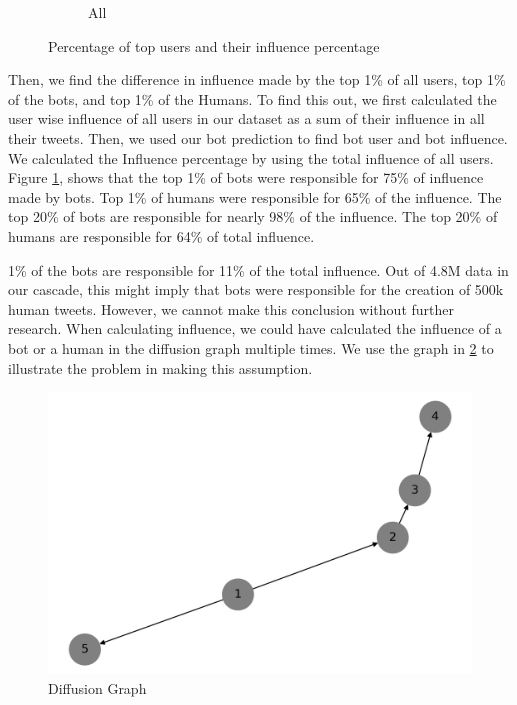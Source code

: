 \documentclass[letterpaper]{article}
\begin{document}
\begin{figure}
\begin{subfigure}[b]{0.8\linewidth}
        \caption{All}
    \end{subfigure}
    \caption{Percentage of top users and their influence percentage}
    \label{fig:top_infuence}
\end{figure}

Then, we find the difference in influence made by the top 1\% of all users, top 1\% of the bots, and top 1\% of the Humans. To find this out, we first calculated the user wise 
influence of all users in our dataset as a sum of their influence in all their tweets. Then, we used our bot prediction to find bot user and bot influence. We calculated the Influence
 percentage by using the total influence of all users. Figure \ref{fig:top_infuence}, shows that 
the top 1\% of bots were responsible for 75\% of influence made by bots. Top 1\% of humans were responsible for 65\% of the influence. The top 20\% of bots are responsible for nearly 98\% of the influence. The top 20\% of humans are responsible for 64\% of total influence. \par

1\% of the bots are responsible for 11\% of the total influence. Out of 4.8M data in our cascade, this might imply that
bots were responsible for the creation of 500k human tweets. However, we cannot make this conclusion without further research. 
When calculating influence, we could have calculated the influence of a bot or a human in the diffusion graph multiple times. We use the graph in \ref{fig:diff_graph} to illustrate 
the problem in making this assumption.

\begin{figure}[h!]
    \includegraphics[width=\linewidth]{images/diffusion_graph.png}
    \caption{Diffusion Graph}
    \label{fig:diff_graph}
\end{figure}
\end{document}

